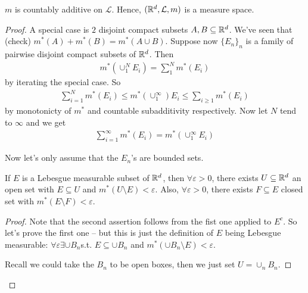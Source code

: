 \documentclass[a4paper]{article}
\begin{document}
\begin{prop}
$m$ is countably additive on $\mathcal{L}$. Hence, $(\mathbb{R}^d,\mathcal{L},m)$ is a measure space.
\begin{proof}
A special case is $2$ disjoint compact subsets $A,B \subseteq \mathbb{R}^d$. We've seen that (check) $m^*(A)+m^*(B)=m^*(A \cup B)$. Suppose now $\{E_n\}_n$ is a family of pairwise disjoint compact subsets of $\mathbb{R}^d$. Then
\begin{equation*}
\begin{aligned}
m^*(\cup_1^N E_i) = \sum_1^N m^*(E_i)
\end{aligned}
\end{equation*}
by iterating the special case. So
\begin{equation*}
\begin{aligned}
\sum_{i=1}^N m^*(E_i) \leq m^*(\cup_1^\infty) E_i \leq \sum_{i \geq 1} m^*(E_i)
\end{aligned}
\end{equation*}
by monotonicty of $m^*$ and countable subadditivity respectively. Now let $N$ tend to $\infty$ and we get
\begin{equation*}
\begin{aligned}
\sum_{i=1}^\infty m^*(E_i) =  m^*(\cup_1^\infty E_i)
\end{aligned}
\end{equation*}

Now let's only assume that the $E_n$'s are bounded sets.


\begin{lemma}
If $E$ is a Lebesgue measurable subset of $\mathbb{R}^d$, then $\forall \varepsilon>0$, there exists $U \subseteq \mathbb{R}^d$ an open set with $E \subseteq U$ and $m^*(U \setminus E) < \varepsilon$. Also, $\forall \varepsilon>0$, there exists $F \subseteq E$ closed set with $m^*(E \setminus F) < \varepsilon$. 
\begin{proof}
Note that the second assertion follows from the fist one applied to $E^c$. So let's prove the first one -- but this is just the definition of $E$ being Lebesgue measurable: $\forall \varepsilon \exists \cup B_n $s.t. $E \subseteq \cup B_n$ and $m^*(\cup B_n \setminus E) < \varepsilon$.

Recall we could take the $B_n$ to be open boxes, then we just set $U= \cup_n B_n$.
\end{proof}
\end{lemma}


\end{proof}
\end{prop}
\end{document}
